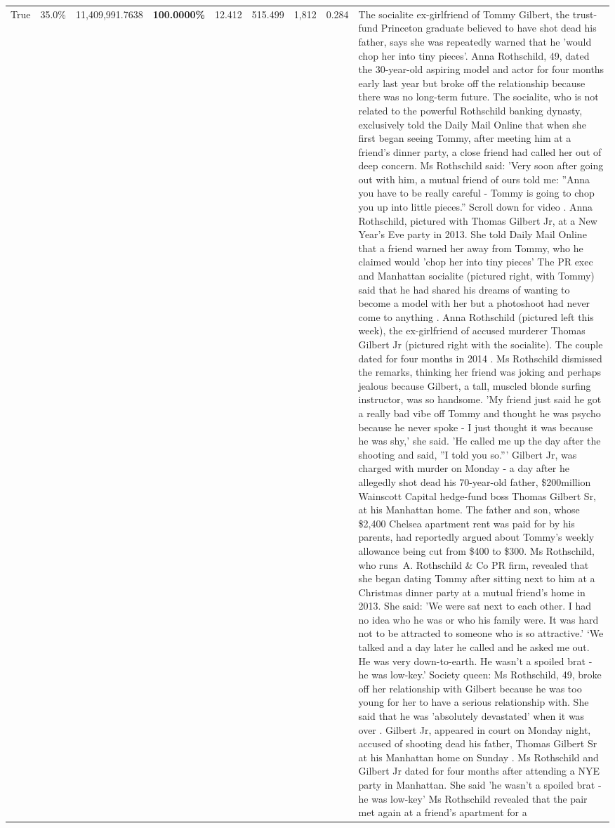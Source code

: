 \begin{table}[H]
\begin{tabular}{lllrlllll}
True & 35.0\% & 11,409,991.7638 & \bfseries \color{red} 100.0000\% & 12.412 & 515.499 & 1,812 & 0.284 & The socialite ex-girlfriend of Tommy Gilbert, the trust-fund Princeton graduate believed to have shot dead his father, says she was repeatedly warned that he 'would chop her into tiny pieces'. Anna Rothschild, 49, dated the 30-year-old aspiring model and actor for four months early last year but broke off the relationship because there was no long-term future. The socialite, who is not related to the powerful Rothschild banking dynasty, exclusively told the Daily Mail Online that when she first began seeing Tommy, after meeting him at a friend's dinner party, a close friend had called her out of deep concern. Ms Rothschild said: 'Very soon after going out with him, a mutual friend of ours told me: ''Anna you have to be really careful - Tommy is going to chop you up into little pieces.'' Scroll down for video . Anna Rothschild, pictured with Thomas Gilbert Jr, at a New Year's Eve party in 2013. She told Daily Mail Online that a friend warned her away from Tommy, who he claimed would 'chop her into tiny pieces' The PR exec and Manhattan socialite (pictured right, with Tommy) said that he had shared his dreams of wanting to become a model with her but a photoshoot had never come to anything . Anna Rothschild (pictured left this week), the ex-girlfriend of accused murderer Thomas Gilbert Jr (pictured right with the socialite). The couple dated for four months in 2014 . Ms Rothschild dismissed the remarks, thinking her friend was joking and perhaps jealous because Gilbert, a tall, muscled blonde surfing instructor, was so handsome. 'My friend just said he got a really bad vibe off Tommy and thought he was psycho because he never spoke - I just thought it was because he was shy,' she said. 'He called me up the day after the shooting and said, ''I told you so.''' Gilbert Jr, was charged with murder on Monday - a day after he allegedly shot dead his 70-year-old father, \$200million Wainscott Capital hedge-fund boss Thomas Gilbert Sr, at his Manhattan home. The father and son, whose \$2,400 Chelsea apartment rent was paid for by his parents, had reportedly argued about Tommy's weekly allowance being cut from \$400 to \$300. Ms Rothschild, who runs A. Rothschild \& Co PR firm, revealed that she began dating Tommy after sitting next to him at a Christmas dinner party at a mutual friend's home in 2013. She said: 'We were sat next to each other. I had no idea who he was or who his family were. It was hard not to be attracted to someone who is so attractive.' ‘We talked and a day later he called and he asked me out. He was very down-to-earth. He wasn’t a spoiled brat - he was low-key.’ Society queen: Ms Rothschild, 49, broke off her relationship with Gilbert because he was too young for her to have a serious relationship with. She said that he was 'absolutely devastated' when it was over . Gilbert Jr, appeared in court on Monday night, accused of shooting dead his father, Thomas Gilbert Sr at his Manhattan home on Sunday . Ms Rothschild and Gilbert Jr dated for four months after attending a NYE party in Manhattan. She said 'he wasn't a spoiled brat - he was low-key' Ms Rothschild revealed that the pair met again at a friend’s apartment for a 
\end{tabular}
\end{table}
